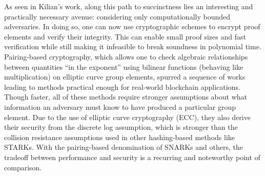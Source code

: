 \noindent As seen in Kilian's work, along this path to succinctness lies an interesting and practically necessary avenue: considering only computationally bounded adversaries. In doing so, one can now use cryptographic schemes to encrypt proof elements and verify their integrity. This can enable small proof sizes and fast verification while still making it infeasible to break soundness in polynomial time. Pairing-based cryptography, which allows one to check algebraic relationships between quantities ``in the exponent'' using bilinear functions (behaving like multiplication) on elliptic curve group elements, spurred a sequence of works leading to methods practical enough for real-world blockchain applications. Though faster, all of these methods require stronger assumptions about what information an adversary must know to have produced a particular group element. Due to the use of elliptic curve cryptography (ECC), they also derive their security from the discrete log assumption, which is stronger than the collision resistance assumptions used in other hashing-based methods like STARKs. With the pairing-based denomination of SNARKs and others, the tradeoff between performance and security is a recurring and noteworthy point of comparison.


